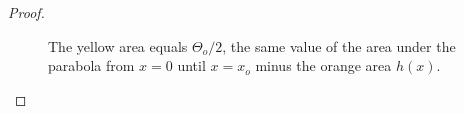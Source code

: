 \begin{proof}
\begin{figure}[h!]\label{fig:parabola-approx-ex}
\center
	\hspace{20pt}%
\caption{The yellow area equals $\Theta_o /2$, the same value of the area under the parabola from $x=0$ until $x=x_o$ minus the orange area $h(x)$.}
\end{figure}


\end{proof}
